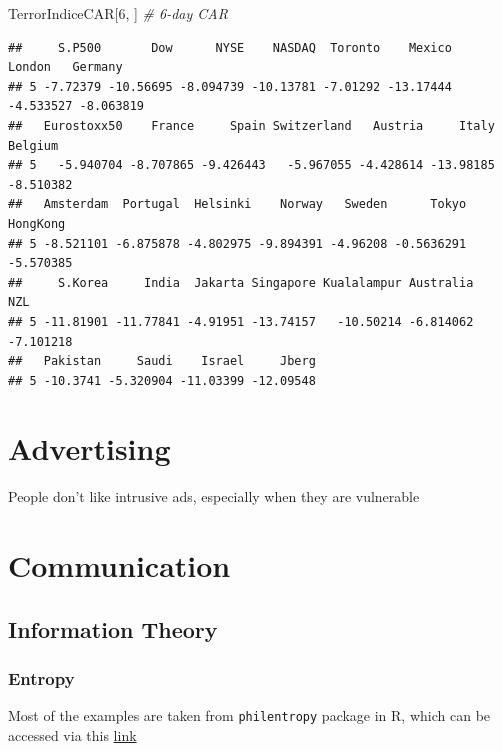 \documentclass[
]{book}
\newenvironment{Shaded}{\begin{snugshade}}{\end{snugshade}}
\newcommand{\CommentTok}[1]{\textcolor[rgb]{0.56,0.35,0.01}{\textit{#1}}}
\newcommand{\DecValTok}[1]{\textcolor[rgb]{0.00,0.00,0.81}{#1}}
\newcommand{\NormalTok}[1]{#1}
\begin{document}
\begin{Shaded}
\begin{Highlighting}[]
\NormalTok{TerrorIndiceCAR[}\DecValTok{6}\NormalTok{, ] }\CommentTok{\# 6{-}day CAR}
\end{Highlighting}
\end{Shaded}

\begin{verbatim}
##     S.P500       Dow      NYSE    NASDAQ  Toronto    Mexico    London   Germany
## 5 -7.72379 -10.56695 -8.094739 -10.13781 -7.01292 -13.17444 -4.533527 -8.063819
##   Eurostoxx50    France     Spain Switzerland   Austria     Italy   Belgium
## 5   -5.940704 -8.707865 -9.426443   -5.967055 -4.428614 -13.98185 -8.510382
##   Amsterdam  Portugal  Helsinki    Norway   Sweden      Tokyo  HongKong
## 5 -8.521101 -6.875878 -4.802975 -9.894391 -4.96208 -0.5636291 -5.570385
##     S.Korea     India  Jakarta Singapore Kualalampur Australia       NZL
## 5 -11.81901 -11.77841 -4.91951 -13.74157   -10.50214 -6.814062 -7.101218
##   Pakistan     Saudi    Israel     Jberg
## 5 -10.3741 -5.320904 -11.03399 -12.09548
\end{verbatim}

\hypertarget{advertising-1}{%
\chapter{Advertising}\label{advertising-1}}

People don't like intrusive ads, especially when they are vulnerable \citep[p.143]{kellogg_2005}

\hypertarget{communication}{%
\chapter{Communication}\label{communication}}

\hypertarget{information-theory}{%
\section{Information Theory}\label{information-theory}}

\hypertarget{entropy}{%
\subsection{Entropy}\label{entropy}}

Most of the examples are taken from \texttt{philentropy} package in R, which can be accessed via this
\href{https://cran.r-project.org/web/packages/philentropy/vignettes/Information_Theory.html}{link}
\end{document}
